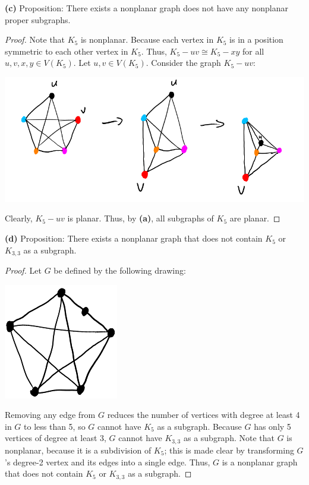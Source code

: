 \documentclass[12pt]{article}
\begin{document}
\textbf{(c)} Proposition: There exists a nonplanar graph does not have any nonplanar proper subgraphs.
\begin{proof}
    Note that $K_{5}$ is nonplanar.
    Because each vertex in $K_5$ is in a position symmetric to each other vertex in $K_5$.
    Thus, $K_5-uv \cong K_5-xy$ for all $u,v,x,y \in V(K_5)$.
    Let $u,v \in V(K_5)$.
    Consider the graph $K_5-uv$:
    \begin{center}\includegraphics[scale=.7]{96c.png}\end{center}
    Clearly, $K_5 - uv$ is planar.
    Thus, by \textbf{(a)}, all subgraphs of $K_5$ are planar.
\end{proof}

\textbf{(d)} Proposition: There exists a nonplanar graph that does not contain $K_5$ or $K_{3,3}$ as a subgraph.
\begin{proof}
    Let $G$ be defined by the following drawing:
    \begin{center}\includegraphics{96d.png}\end{center}
    Removing any edge from $G$ reduces the number of vertices with degree at least 4 in $G$ to less than 5, so $G$ cannot have $K_5$ as a subgraph.
    Because $G$ has only 5 vertices of degree at least 3, $G$ cannot have $K_{3,3}$ as a subgraph.
    Note that $G$ is nonplanar, because it is a subdivision of $K_5$; this is made clear by transforming $G$'s degree-2 vertex and its edges into a single edge.
    Thus, $G$ is a nonplanar graph that does not contain $K_5$ or $K_{3,3}$ as a subgraph.
\end{proof}
\end{document}
